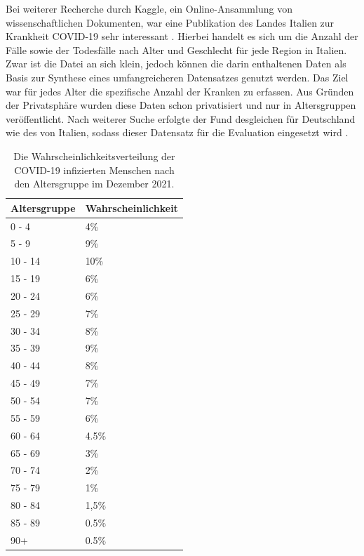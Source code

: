Bei weiterer Recherche durch Kaggle, ein Online-Ansammlung von wissenschaftlichen Dokumenten, war eine Publikation des Landes Italien zur Krankheit COVID-19 sehr interessant \parencite{CovidItalien}. Hierbei handelt es sich um die Anzahl der Fälle sowie der Todesfälle nach Alter und Geschlecht für jede Region in Italien. Zwar ist die Datei an sich klein, jedoch können die darin enthaltenen Daten als Basis zur Synthese eines umfangreicheren Datensatzes genutzt werden. Das Ziel war für jedes Alter die spezifische Anzahl der Kranken zu erfassen. Aus Gründen der Privatsphäre wurden diese Daten schon privatisiert und nur in Altersgruppen veröffentlicht.
Nach weiterer Suche erfolgte der Fund desgleichen für Deutschland wie des von Italien, sodass dieser Datensatz für die Evaluation eingesetzt wird \parencite{RKIAltersverteilung}.
\begin{table}[ht]
	\centering
	\begin{tabular}{l l} \toprule
		\textbf{Altersgruppe} & \textbf{Wahrscheinlichkeit}  \\ \midrule
		0 - 4	&  4\% \\
		5 - 9	&  9\% \\
		10 - 14	&  10\% \\
		15 - 19	& 6\%  \\
		20 - 24	& 6\%  \\
		25 - 29	&  7\% \\
		30 - 34	&  8\% \\
		35 - 39	&  9\% \\
		40 - 44	&  8\% \\
		45 - 49	& 7\%  \\
		50 - 54	& 7\%  \\
		55 - 59	& 6\%  \\
		60 - 64	& 4.5\% \\
		65 - 69	&  3\% \\
		70 - 74	& 2\%  \\
		75 - 79	& 1\%  \\
		80 - 84	&  1,5\% \\
		85 - 89	& 0.5\%  \\
		90+& 0.5\%  \\ \bottomrule
	\end{tabular}
	\caption{Die Wahrscheinlichkeitsverteilung der COVID-19 infizierten Menschen nach den Altersgruppe im Dezember 2021.}
	\label{tab : age_distribution}
\end{table}
